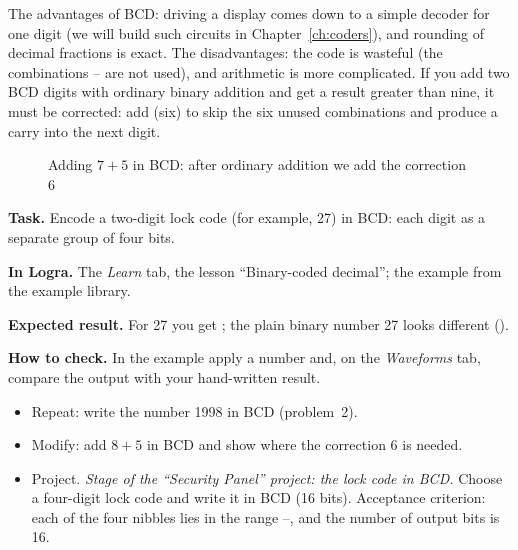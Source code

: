The advantages of BCD: driving a display comes down to a simple decoder for
one digit (we will build such circuits in Chapter~\ref{ch:coders}), and
rounding of decimal fractions is exact. The disadvantages: the code is
wasteful (the combinations -- are not used), and
arithmetic is more complicated.
If you add two BCD digits with ordinary binary addition and get a result
greater than nine, it must be corrected: add  (six) to skip the
six unused combinations and produce a carry into the next digit.

\begin{figure}[H]
\centering
{}
\caption{Adding $7+5$ in BCD: after ordinary addition we add the correction 6}
\end{figure}

\begin{diybox}
\textbf{Task.} Encode a two-digit lock code (for example, 27) in BCD:
each digit as a separate group of four bits.\par
\textbf{In Logra.} The \emph{Learn} tab, the lesson ``Binary-coded decimal'';
the  example from the example library.\par
\textbf{Expected result.} For 27 you get ; the plain
binary number 27 looks different ().\par
\textbf{How to check.} In the  example apply a number and, on
the \emph{Waveforms} tab, compare the output with your hand-written result.
\begin{itemize}[leftmargin=3.4em,labelwidth=3em,labelsep=0.4em,align=left]
  \item[\stars{1}] Repeat: write the number 1998 in BCD (problem~2).
  \item[\stars{2}] Modify: add $8+5$ in BCD and show where the correction 6 is needed.
  \item[\stars{3}] Project. \emph{Stage of the ``Security Panel'' project: the lock code in
    BCD.} Choose a four-digit lock code and write it in BCD
    (16 bits). Acceptance criterion: each of the four nibbles lies in the
    range --, and the number of output bits is 16.
\end{itemize}
\end{diybox}

